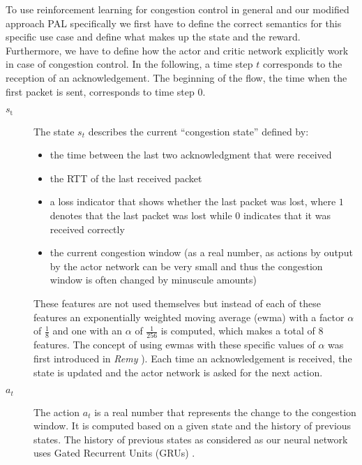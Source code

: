 \documentclass[10pt,sigconf,anonymous]{acmart}
\begin{document}
To use reinforcement learning for congestion control in general and our modified approach PAL specifically we first have to define the correct semantics for this specific use case and define what makes up the state and the reward. Furthermore, we have to define how the actor and critic network explicitly work in case of congestion control. In the following, a time step $t$ corresponds to the reception of an acknowledgement. The beginning of the flow, the time when the first packet is sent, corresponds to time step $0$.

\begin{description}
\item[$\textit{s}_\text{t}$] The state $s_t$ describes the current ``congestion state'' defined by:
\begin{itemize}
\item the time between the last two acknowledgment that were received
\item the RTT of the last received packet
\item a loss indicator that shows whether the last packet was lost, where $1$ denotes that the last packet was lost while $0$ indicates that it was received correctly
\item the current congestion window (as a real number, as actions by output by the actor network can be very small and thus the congestion window is often changed by minuscule amounts)%
\end{itemize}
These features are not used themselves but instead of each of these features an exponentially weighted moving average (ewma) with a factor $\alpha$ of $\frac{1}{8}$ and one with an $\alpha$ of $\frac{1}{256}$ is computed, which makes a total of 8 features. The concept of using ewmas with these specific values of $\alpha$ was first introduced in \textit{Remy} \cite{winstein_tcp_2013}).
Each time an acknowledgement is received, the state is updated and the actor network is asked for the next action.
\item[$\textit{a}_t$] The action $a_t$ is a real number that represents the change to the congestion window. It is computed based on a given state and the history of previous states. The history of previous states as considered as our neural network uses Gated Recurrent Units (GRUs) \cite{cho_learning_2014}.  


\end{description}
\end{document}
